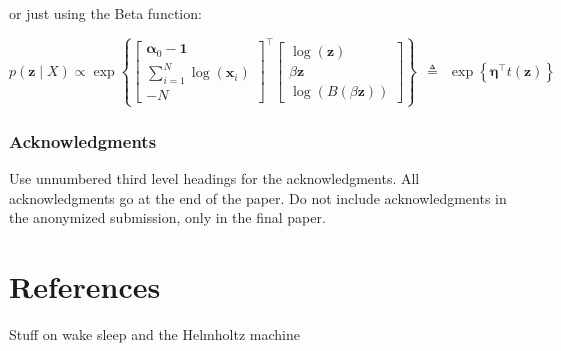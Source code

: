 \documentclass{article}
\begin{document}
or just using the Beta function:

$$
p(\pmb{z} \mid X) \propto \exp\left\{\begin{bmatrix} \pmb{\alpha}_0 - \pmb{1} \\  \sum_{i=1}^N \log(\pmb{x}_i)  \\ -N  \end{bmatrix}^\top \begin{bmatrix} \log(\pmb{z}) \\ \beta \pmb{z} \\ \log (B( \beta \pmb{z})) \end{bmatrix} \right\}  ~~\triangleq~~ \exp\left\{ \pmb{\eta}^\top t(\pmb{z}) \right\}
$$


%

  
\clearpage

\subsubsection*{Acknowledgments}

Use unnumbered third level headings for the acknowledgments. All
acknowledgments go at the end of the paper. Do not include
acknowledgments in the anonymized submission, only in the final paper.

\section*{References}




Stuff on wake sleep and the Helmholtz machine
\end{document}
